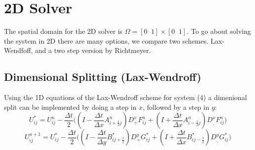 
\section{2D Solver}
The spatial domain for the 2D solver is $\Omega=[0\;\;1]\times[0\;\;1]$. To go about solving the system in 2D there are many options,
we compare two schemes. Lax-Wendfoff, and a two step version by Richtmeyer. \newline

\subsection{Dimensional Splitting (Lax-Wendroff)}

Using the 1D equations of the Lax-Wendroff scheme for system (4) a dimenional split can be implemented by 
doing a step in $x$, followed by a step in $y$: 
\begin{equation}\label{eqn:6}
U_{ij}^* = U_{ij}^n - \frac{\Delta t}{2} 
\bigg(( I- \frac{\Delta t}{\Delta x} A_{i+\frac{1}{2}j}^n ) D_+^xF_{ij}^n 
+ (I+ \frac{\Delta t}{\Delta x} A_{i-\frac{1}{2}j}^n) D_{\_}^xF_{ij}^n\bigg)
\end{equation}
\begin{equation}\label{eqn:7}
U_{ij}^{n+1} = U_{ij}^* - 
\frac{\Delta t}{2} \bigg((I - \frac{\Delta t}{\Delta y} B_{ij+\frac{1}{2}}^*) D_+^yG_{ij}^*
 +(I + \frac{\Delta t}{\Delta x} B_{ij-\frac{1}{2}}^*) D_{\_}^y G_{ij}^* \bigg)
\end{equation}

